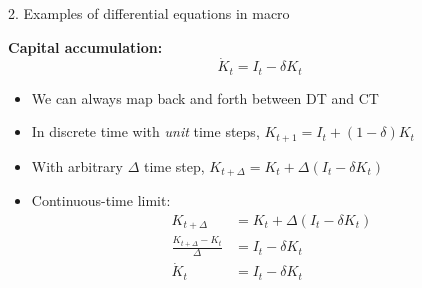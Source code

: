 \documentclass[10pt]{beamer}
\begin{document}
\begin{frame}{2. Examples of differential equations in macro}

\textbf{Capital accumulation:}
\begin{equation*}
	\dot K_t = I_t - \delta K_t
\end{equation*}
\begin{itemize}
\item We can always map back and forth between DT and CT

\item In discrete time with \textit{unit} time steps, $K_{t+1} = I_t + (1-\delta) K_t$

\item With arbitrary $\Delta$ time step, $K_{t+\Delta} = K_t + \Delta (I_t - \delta K_t)$

\item Continuous-time limit:
\begin{align*}
	K_{t+\Delta} &= K_t + \Delta (I_t - \delta K_t) \\
	\frac{K_{t+\Delta} - K_t}{\Delta} &= I_t -\delta K_t \\
	\dot K_t &= I_t -\delta K_t
\end{align*}
\end{itemize}
\end{frame}
\end{document}
